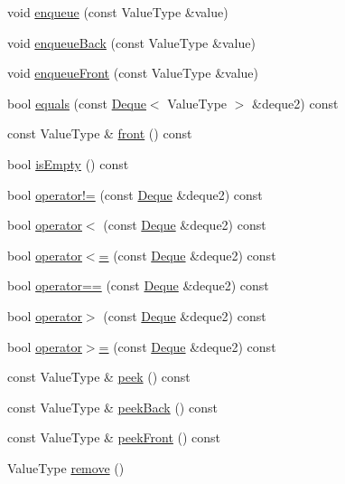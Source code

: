 \begin{DoxyCompactItemize}
\item 
void \mbox{\hyperlink{classDeque_a663f69ed5d98f3f167202e9b2d7e7a9a}{enqueue}} (const Value\+Type \&value)
\item 
void \mbox{\hyperlink{classDeque_a2fdd7308cc72a3bd03dd6345ef778a65}{enqueue\+Back}} (const Value\+Type \&value)
\item 
void \mbox{\hyperlink{classDeque_a12586c9fec2e0dd724cf6ccb4d52c6e8}{enqueue\+Front}} (const Value\+Type \&value)
\item 
bool \mbox{\hyperlink{classDeque_a2468abeaef57d95b43a90b7462ff88ab}{equals}} (const \mbox{\hyperlink{classDeque}{Deque}}$<$ Value\+Type $>$ \&deque2) const
\item 
const Value\+Type \& \mbox{\hyperlink{classDeque_a02aaa52ad7a120201f6dd3e90eff737f}{front}} () const
\item 
bool \mbox{\hyperlink{classDeque_acf82f9b2937375c7b1cf3dccb3df3312}{is\+Empty}} () const
\item 
bool \mbox{\hyperlink{classDeque_a512bc8214fed49868d85acd8f1e351d3}{operator!=}} (const \mbox{\hyperlink{classDeque}{Deque}} \&deque2) const
\item 
bool \mbox{\hyperlink{classDeque_afdfe6d4b99c8d185f9f8c6d48fc19c88}{operator$<$}} (const \mbox{\hyperlink{classDeque}{Deque}} \&deque2) const
\item 
bool \mbox{\hyperlink{classDeque_a08a801e1cca1a84e7fae799f5c12696e}{operator$<$=}} (const \mbox{\hyperlink{classDeque}{Deque}} \&deque2) const
\item 
bool \mbox{\hyperlink{classDeque_a7c3d72e4bc4a27ebfd08adbcddbb80f8}{operator==}} (const \mbox{\hyperlink{classDeque}{Deque}} \&deque2) const
\item 
bool \mbox{\hyperlink{classDeque_ad16a7887ef76856de7f882fb53cc8992}{operator$>$}} (const \mbox{\hyperlink{classDeque}{Deque}} \&deque2) const
\item 
bool \mbox{\hyperlink{classDeque_a033d291120793fffa944ffcc72cc947a}{operator$>$=}} (const \mbox{\hyperlink{classDeque}{Deque}} \&deque2) const
\item 
const Value\+Type \& \mbox{\hyperlink{classDeque_a74501ededf728c31068dd28a70a8a1f2}{peek}} () const
\item 
const Value\+Type \& \mbox{\hyperlink{classDeque_a617bbcedcfbc36e19f4aa806074da07e}{peek\+Back}} () const
\item 
const Value\+Type \& \mbox{\hyperlink{classDeque_a7bac5f26f5665291d89e8de29496ee79}{peek\+Front}} () const
\item 
Value\+Type \mbox{\hyperlink{classDeque_a025ec97fa5b04552f5ad0902c1f02ac1}{remove}} ()

\end{DoxyCompactItemize}
